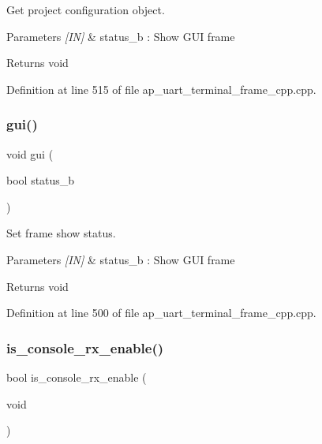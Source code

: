 Get project configuration object. 


\begin{DoxyParams}{Parameters}
{\em \mbox{[}\+I\+N\mbox{]}} & status\+\_\+b \+: Show G\+UI frame \\
\hline
\end{DoxyParams}
\begin{DoxyReturn}{Returns}
void 
\end{DoxyReturn}


Definition at line 515 of file ap\+\_\+uart\+\_\+terminal\+\_\+frame\+\_\+cpp.\+cpp.

\mbox{\label{group___u_a_r_t__terminal_ga1986b0e4e7fba4b4af869473513e1ce9}} 
\subsubsection{gui()}
{\footnotesize\ttfamily void gui (\begin{DoxyParamCaption}\item[{bool}]{status\+\_\+b }\end{DoxyParamCaption})}



Set frame show status. 


\begin{DoxyParams}{Parameters}
{\em \mbox{[}\+I\+N\mbox{]}} & status\+\_\+b \+: Show G\+UI frame \\
\hline
\end{DoxyParams}
\begin{DoxyReturn}{Returns}
void 
\end{DoxyReturn}


Definition at line 500 of file ap\+\_\+uart\+\_\+terminal\+\_\+frame\+\_\+cpp.\+cpp.

\mbox{\label{group___u_a_r_t__terminal_ga7ba59ce4eb6c8eb6bdf549389b59ef43}} 
\subsubsection{is\_console\_rx\_enable()}
{\footnotesize\ttfamily bool is\+\_\+console\+\_\+rx\+\_\+enable (\begin{DoxyParamCaption}\item[{void}]{ }\end{DoxyParamCaption})}



